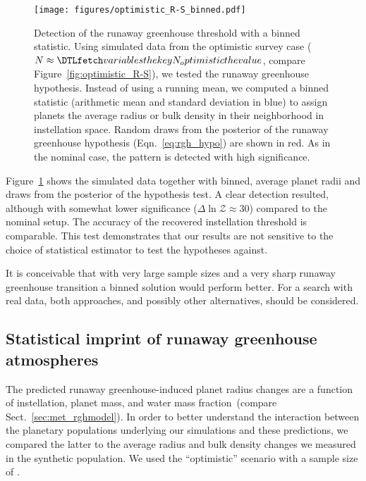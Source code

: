 \documentclass[twocolumn,twocolappendix]{aastex631}
\begin{document}
\begin{figure}[ht!]
    \begin{centering}
        \texttt{[image: figures/optimistic\_R-S\_binned.pdf]}
        \caption{
            Detection of the runaway greenhouse threshold with a binned statistic.
            Using simulated data from the optimistic survey case ($N \approx \var{N_optimistic}$, compare Figure~\ref{fig:optimistic_R-S}), we tested the runaway greenhouse hypothesis. Instead of using a running mean, we computed a binned statistic (arithmetic mean and standard deviation in blue) to assign planets the average radius or bulk density in their neighborhood in instellation space. Random draws from the posterior of the runaway greenhouse hypothesis (Eqn.~\ref{eq:rgh_hypo}) are shown in red.
            As in the nominal case, the pattern is detected with high significance.
        }
        \label{fig:optimistic_R-S_binned}
    \end{centering}
\end{figure}
Figure~\ref{fig:optimistic_R-S_binned} shows the simulated data together with binned, average planet radii and draws from the posterior of the hypothesis test.
A clear detection resulted, although with somewhat lower significance ($\Delta \ln \mathcal{Z} \approx 30$) compared to the nominal setup.
The accuracy of the recovered instellation threshold is comparable.
This test demonstrates that our results are not sensitive to the choice of statistical estimator to test the hypotheses against.

It is conceivable that with very large sample sizes and a very sharp runaway greenhouse transition a binned solution would perform better.
For a search with real data, both approaches, and possibly other alternatives, should be considered.

\subsection{Statistical imprint of runaway greenhouse atmospheres}\label{app:model-pop_comparison}
The predicted runaway greenhouse-induced planet radius changes are a function of instellation, planet mass, and water mass fraction~(compare Sect.~\ref{sec:met_rghmodel}).
In order to better understand the interaction between the planetary populations underlying our simulations and these predictions, we compared the latter to the average radius and bulk density changes we measured in the synthetic population.
We used the ``optimistic'' scenario with a sample size of .
\end{document}

